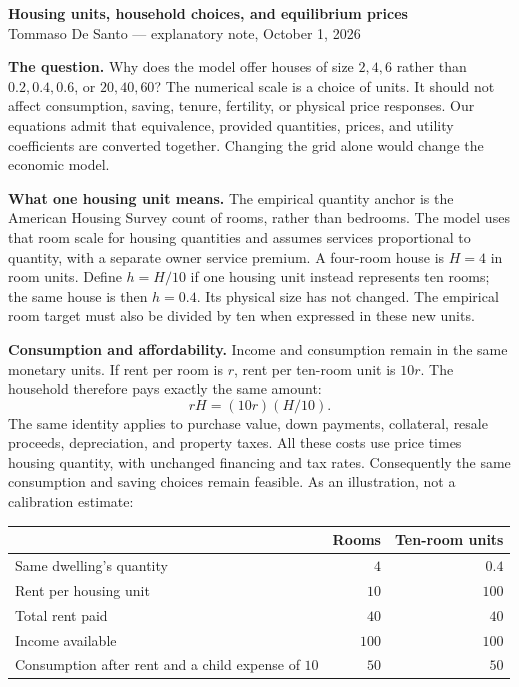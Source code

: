 \documentclass[11pt,letterpaper]{article}
\begin{document}
\begin{center}
{\Large\bfseries Housing units, household choices, and equilibrium prices}\\[4pt]
{\small Tommaso De Santo --- explanatory note, October 1, 2026}
\end{center}

\textbf{The question.} Why does the model offer houses of size $2,4,6$ rather
than $0.2,0.4,0.6$, or $20,40,60$? The numerical scale is a choice of units.
It should not affect consumption, saving, tenure, fertility, or physical price
responses. Our equations admit that equivalence, provided quantities, prices,
and utility coefficients are converted together. Changing the grid alone would
change the economic model.

\textbf{What one housing unit means.} The empirical quantity anchor is the
American Housing Survey count of rooms, rather than bedrooms. The model uses
that room scale for housing quantities and assumes services proportional to
quantity, with a separate owner service premium. A four-room house is $H=4$
in room units. Define $h=H/10$ if one housing unit instead represents ten rooms;
the same house is then $h=0.4$. Its physical size has not changed. The empirical
room target must also be divided by ten when expressed in these new units.

\textbf{Consumption and affordability.} Income and consumption remain in the
same monetary units. If rent per room is $r$, rent per ten-room unit is $10r$.
The household therefore pays exactly the same amount:
\[
 rH=(10r)(H/10).
\]
The same identity applies to purchase value, down payments, collateral, resale
proceeds, depreciation, and property taxes. All these costs use price times
housing quantity, with unchanged financing and tax rates. Consequently the
same consumption and saving choices remain feasible. As an illustration,
not a calibration estimate:
\begin{center}
\begin{tabular}{lrr}
\toprule
 & Rooms & Ten-room units\\
\midrule
Same dwelling's quantity & $4$ & $0.4$\\
Rent per housing unit & $10$ & $100$\\
Total rent paid & $40$ & $40$\\
Income available & $100$ & $100$\\
Consumption after rent and a child expense of $10$ & $50$ & $50$\\
\bottomrule
\end{tabular}
\end{center}
\end{document}
